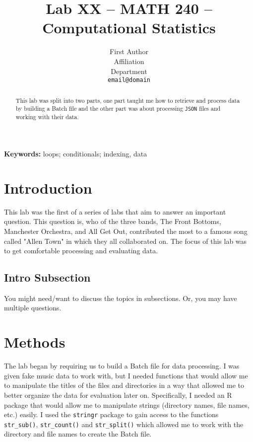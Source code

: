 \documentclass{article}\usepackage[]{graphicx}\usepackage[]{xcolor}
\begin{document}
\vspace{-1in}
\title{Lab XX -- MATH 240 -- Computational Statistics}

\author{
  First Author \\
  Affiliation  \\
  Department  \\
  {\tt email@domain}
}

\date{}

\maketitle

\begin{multicols}{2}
\begin{abstract}
This lab was split into two parts, one part taught me how to retrieve and process data by building a Batch file and the other part was about processing \texttt{JSON} files and working with their data. 
\end{abstract}

\noindent \textbf{Keywords:} loops; conditionals; indexing, data

\section{Introduction}

This lab was the first of a series of labs that aim to answer an important question. This question is, who of the three bands, The Front Bottoms, Manchester Orchestra, and All Get Out, contributed the most to a famous song called "Allen Town" in which they all collaborated on. The focus of this lab was to get comfortable processing and evaluating data.


\subsection{Intro Subsection}
You might need/want to discuss the topics in subsections. Or, you may have multiple questions.


\section{Methods}
The lab began by requiring us to build a Batch file for data processing. I was given fake music data to work with, but I needed functions that would allow me to manipulate the titles of the files and directories in a way that allowed me to better organize the data for evaluation later on. Specifically, I needed an R package that would allow me to manipulate strings (directory names, file names, etc.) easily. I used the \texttt{stringr} package to gain access to the functions \texttt{str\_sub()}, \texttt{str\_count()} and \texttt{str\_split()} which allowed me to work with the directory and file names to create the Batch file. \\


\end{multicols}
\end{document}
